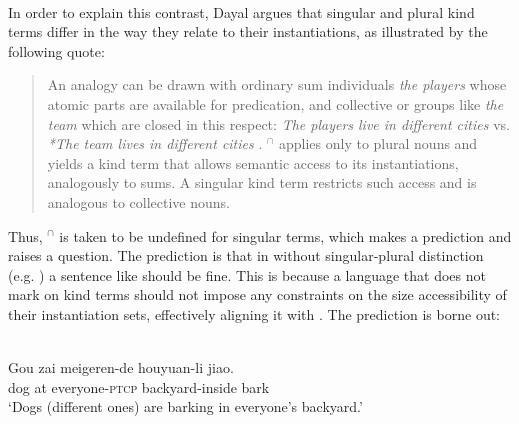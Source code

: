 \documentclass[output=paper,
modfonts
]{langscibook}
\begin{document}
	\ea \label{ex:despic:38}
	 \\
	\z 
	\z 
	
	In order to explain this contrast, Dayal argues that singular and plural kind terms differ in the way they relate to their instantiations, as illustrated by the following quote:\largerpage
	
	\begin{quote} 
		An analogy can be drawn with ordinary sum individuals \textit{the players} whose atomic parts are available for predication, and collective  or groups like \textit{the team} which are closed in this respect: \textit{The players live in different cities} vs. \textit{*The team lives in different cities} \citep{Barker1992, Schwarzschild1996}. $^\cap$ applies only to plural nouns and yields a kind term that allows semantic access to its instantiations, analogously to sums. A singular kind term restricts such access and is analogous to collective nouns. \citep[1100]{Dayal2011}
	\end{quote} 
	
	Thus, $^\cap$ is taken to be undefined for singular terms, which makes a prediction and raises a question. The prediction is that in  without singular-plural distinction (e.g. ) a sentence like  should be fine. This is because a language that does not mark  on kind terms should not impose any constraints on the size accessibility of their instantiation sets, effectively aligning it with . The prediction is borne out:
	
	\ea \label{ex:despic:39}
	 \\
	\gll
	{Gou} {zai} {meigeren-de} {houyuan-li} {jiao.} \\
	dog at everyone-\textsc{ptcp} backyard-inside bark \\
	\glt `Dogs (different ones) are barking in everyone's backyard.' \citep[413]{Dayal2004}
	\z 
	
\end{document}

